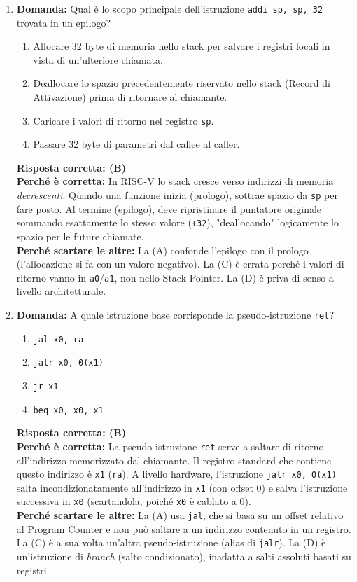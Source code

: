 \documentclass[12pt, a4paper]{article}
\begin{document}
\begin{enumerate}
    \item \textbf{Domanda:} Qual è lo scopo principale dell'istruzione \texttt{addi sp, sp, 32} trovata in un epilogo?
    \begin{enumerate}[label=(\Alph*)]
        \item Allocare 32 byte di memoria nello stack per salvare i registri locali in vista di un'ulteriore chiamata.
        \item Deallocare lo spazio precedentemente riservato nello stack (Record di Attivazione) prima di ritornare al chiamante.
        \item Caricare i valori di ritorno nel registro \texttt{sp}.
        \item Passare 32 byte di parametri dal callee al caller.
    \end{enumerate}
    \textbf{Risposta corretta: (B)} \\
    \textbf{Perché è corretta:} In RISC-V lo stack cresce verso indirizzi di memoria \textit{decrescenti}. Quando una funzione inizia (prologo), sottrae spazio da \texttt{sp} per fare posto. Al termine (epilogo), deve ripristinare il puntatore originale sommando esattamente lo stesso valore (\texttt{+32}), "deallocando" logicamente lo spazio per le future chiamate. \\
    \textbf{Perché scartare le altre:} La (A) confonde l'epilogo con il prologo (l'allocazione si fa con un valore negativo). La (C) è errata perché i valori di ritorno vanno in \texttt{a0}/\texttt{a1}, non nello Stack Pointer. La (D) è priva di senso a livello architetturale.

    \item \textbf{Domanda:} A quale istruzione base corrisponde la pseudo-istruzione \texttt{ret}?
    \begin{enumerate}[label=(\Alph*)]
        \item \texttt{jal x0, ra}
        \item \texttt{jalr x0, 0(x1)}
        \item \texttt{jr x1}
        \item \texttt{beq x0, x0, x1}
    \end{enumerate}
    \textbf{Risposta corretta: (B)} \\
    \textbf{Perché è corretta:} La pseudo-istruzione \texttt{ret} serve a saltare di ritorno all'indirizzo memorizzato dal chiamante. Il registro standard che contiene questo indirizzo è \texttt{x1} (\texttt{ra}). A livello hardware, l'istruzione \texttt{jalr x0, 0(x1)} salta incondizionatamente all'indirizzo in \texttt{x1} (con offset 0) e salva l'istruzione successiva in \texttt{x0} (scartandola, poiché \texttt{x0} è cablato a 0). \\
    \textbf{Perché scartare le altre:} La (A) usa \texttt{jal}, che si basa su un offset relativo al Program Counter e non può saltare a un indirizzo contenuto in un registro. La (C) è a sua volta un'altra pseudo-istruzione (alias di \texttt{jalr}). La (D) è un'istruzione di \textit{branch} (salto condizionato), inadatta a salti assoluti basati su registri.


\end{enumerate}
\end{document}
